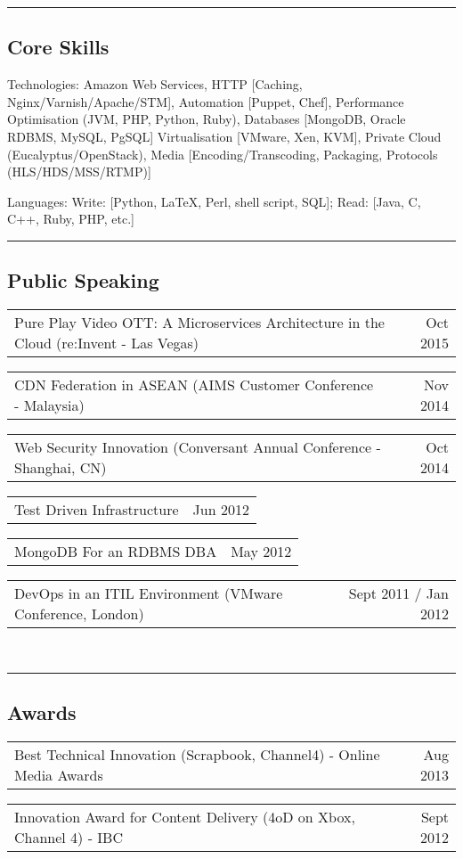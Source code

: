 \documentclass[10pt,a4paper]{article}
\makeatletter
\newenvironment{indentsection}[1]%
{\begin{list}{}%
    {\setlength{\leftmargin}{#1}}%
    \item[]%
}
{\end{list}}
\newcommand{\headerrow}[2]
{\begin{tabular*}{\linewidth}{l@{\extracolsep{\fill}}r}
    #1 &
    #2 \\
\end{tabular*}}
\makeatother
\begin{document}
\hrule
\vspace{-0.4em}
\subsection*{Core Skills}

\begin{indentsection}{\parindent}
\begin{description*}
    \item[Technologies:]
    Amazon Web Services, HTTP [Caching, Nginx/Varnish/Apache/STM], Automation [Puppet, Chef], Performance Optimisation (JVM, PHP, Python, Ruby), Databases [MongoDB, Oracle RDBMS, MySQL, PgSQL] Virtualisation [VMware, Xen, KVM], Private Cloud (Eucalyptus/OpenStack), Media [Encoding/Transcoding, Packaging, Protocols (HLS/HDS/MSS/RTMP)]
    \item[Languages:]
    Write: [Python, \LaTeX, Perl, shell script, SQL]; Read: [Java, C, C++, Ruby, PHP, etc.]
\end{description*}
\end{indentsection}

\hrule
\vspace{-0.4em}
\subsection*{Public Speaking}
    \headerrow
        {Pure Play Video OTT: A Microservices Architecture in the Cloud (re:Invent - Las Vegas)}
        {Oct 2015}
    \headerrow
        {CDN Federation in ASEAN (AIMS Customer Conference - Malaysia)}
        {Nov 2014}
    \headerrow
        {Web Security Innovation (Conversant Annual Conference - Shanghai, CN)}
        {Oct 2014}
    \headerrow
        {Test Driven Infrastructure}
        {Jun 2012}
    \headerrow
        {MongoDB For an RDBMS DBA}
        {May 2012}
    \headerrow
        {DevOps in an ITIL Environment (VMware Conference, London)}
        {Sept 2011 / Jan 2012}
\\
\hrule
\vspace{-0.4em}
\subsection*{Awards}
    \headerrow
        {Best Technical Innovation (Scrapbook, Channel4) - Online Media Awards}
        {Aug 2013}
    \headerrow
        {Innovation Award for Content Delivery (4oD on Xbox, Channel 4) - IBC}
        {Sept 2012}
\end{document}
